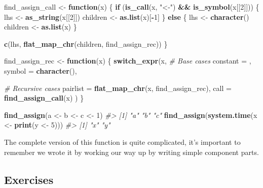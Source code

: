 \documentclass[]{book}
\newenvironment{Shaded}{\begin{snugshade}}{\end{snugshade}}
\newcommand{\CommentTok}[1]{\textcolor[rgb]{0.37,0.37,0.37}{\textit{#1}}}
\newcommand{\ControlFlowTok}[1]{\textcolor[rgb]{0.27,0.27,0.27}{\textbf{#1}}}
\newcommand{\DataTypeTok}[1]{\textcolor[rgb]{0.27,0.27,0.27}{#1}}
\newcommand{\DecValTok}[1]{\textcolor[rgb]{0.06,0.06,0.06}{#1}}
\newcommand{\KeywordTok}[1]{\textcolor[rgb]{0.27,0.27,0.27}{\textbf{#1}}}
\newcommand{\NormalTok}[1]{#1}
\newcommand{\OperatorTok}[1]{\textcolor[rgb]{0.43,0.43,0.43}{\textbf{#1}}}
\newcommand{\StringTok}[1]{\textcolor[rgb]{0.5,0.5,0.5}{#1}}
\begin{document}
\begin{Shaded}
\begin{Highlighting}[]
\NormalTok{find_assign_call <-}\StringTok{ }\ControlFlowTok{function}\NormalTok{(x) \{}
  \ControlFlowTok{if}\NormalTok{ (}\KeywordTok{is_call}\NormalTok{(x, }\StringTok{"<-"}\NormalTok{) }\OperatorTok{&&}\StringTok{ }\KeywordTok{is_symbol}\NormalTok{(x[[}\DecValTok{2}\NormalTok{]])) \{}
\NormalTok{    lhs <-}\StringTok{ }\KeywordTok{as_string}\NormalTok{(x[[}\DecValTok{2}\NormalTok{]])}
\NormalTok{    children <-}\StringTok{ }\KeywordTok{as.list}\NormalTok{(x)[}\OperatorTok{-}\DecValTok{1}\NormalTok{]}
\NormalTok{  \} }\ControlFlowTok{else}\NormalTok{ \{}
\NormalTok{    lhs <-}\StringTok{ }\KeywordTok{character}\NormalTok{()}
\NormalTok{    children <-}\StringTok{ }\KeywordTok{as.list}\NormalTok{(x)}
\NormalTok{  \}}

  \KeywordTok{c}\NormalTok{(lhs, }\KeywordTok{flat_map_chr}\NormalTok{(children, find_assign_rec))}
\NormalTok{\}}

\NormalTok{find_assign_rec <-}\StringTok{ }\ControlFlowTok{function}\NormalTok{(x) \{}
  \KeywordTok{switch_expr}\NormalTok{(x,}
    \CommentTok{# Base cases}
    \DataTypeTok{constant =}\NormalTok{ ,}
    \DataTypeTok{symbol =} \KeywordTok{character}\NormalTok{(),}

    \CommentTok{# Recursive cases}
    \DataTypeTok{pairlist =} \KeywordTok{flat_map_chr}\NormalTok{(x, find_assign_rec),}
    \DataTypeTok{call =} \KeywordTok{find_assign_call}\NormalTok{(x)}
\NormalTok{  )}
\NormalTok{\}}

\KeywordTok{find_assign}\NormalTok{(a <-}\StringTok{ }\NormalTok{b <-}\StringTok{ }\NormalTok{c <-}\StringTok{ }\DecValTok{1}\NormalTok{)}
\CommentTok{#> [1] "a" "b" "c"}
\KeywordTok{find_assign}\NormalTok{(}\KeywordTok{system.time}\NormalTok{(x <-}\StringTok{ }\KeywordTok{print}\NormalTok{(y <-}\StringTok{ }\DecValTok{5}\NormalTok{)))}
\CommentTok{#> [1] "x" "y"}
\end{Highlighting}
\end{Shaded}

The complete version of this function is quite complicated, it's important to remember we wrote it by working our way up by writing simple component parts.

\hypertarget{exercises-3}{%
\subsection{Exercises}\label{exercises-3}}
\end{document}
